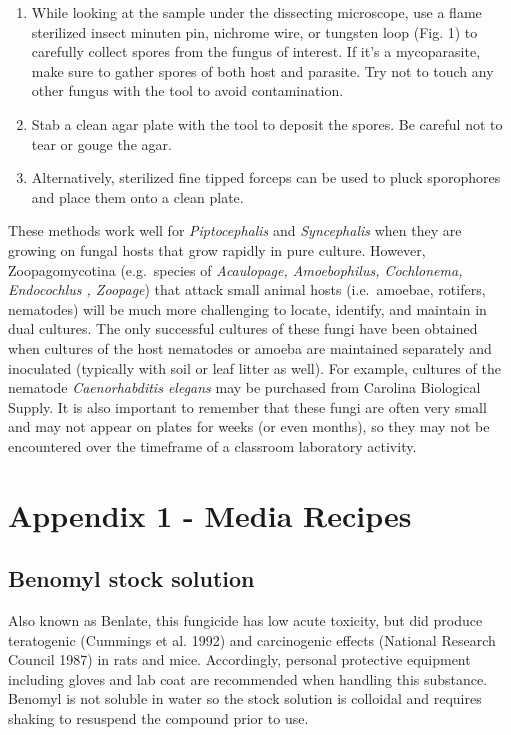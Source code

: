 \documentclass[]{book}
\providecommand{\tightlist}{%
  \setlength{\itemsep}{0pt}\setlength{\parskip}{0pt}}
\begin{document}
\begin{enumerate}
\def\labelenumi{\arabic{enumi}.}
\tightlist
\item
  While looking at the sample under the dissecting microscope, use a
  flame sterilized insect minuten pin, nichrome wire, or tungsten loop
  (Fig. 1) to carefully collect spores from the fungus of interest. If
  it's a mycoparasite, make sure to gather spores of both host and
  parasite. Try not to touch any other fungus with the tool to avoid
  contamination.
\item
  Stab a clean agar plate with the tool to deposit the spores. Be
  careful not to tear or gouge the agar.
\item
  Alternatively, sterilized fine tipped forceps can be used to pluck
  sporophores and place them onto a clean plate.
\end{enumerate}

These methods work well for \emph{Piptocephalis} and \emph{Syncephalis}
when they are growing on fungal hosts that grow rapidly in pure culture.
However, Zoopagomycotina (e.g.~species of \emph{Acaulopage,
Amoebophilus, Cochlonema, Endocochlus , Zoopage}) that attack small
animal hosts (i.e.~amoebae, rotifers, nematodes) will be much more
challenging to locate, identify, and maintain in dual cultures. The only
successful cultures of these fungi have been obtained when cultures of
the host nematodes or amoeba are maintained separately and inoculated
(typically with soil or leaf litter as well). For example, cultures of
the nematode \emph{Caenorhabditis elegans} may be purchased from
Carolina Biological Supply. It is also important to remember that these
fungi are often very small and may not appear on plates for weeks (or
even months), so they may not be encountered over the timeframe of a
classroom laboratory activity.

\section{Appendix 1 - Media Recipes}\label{appendix-1---media-recipes}

\subsection{Benomyl stock solution}\label{benomyl-stock-solution}

Also known as Benlate, this fungicide has low acute toxicity, but did
produce teratogenic (Cummings et al. 1992) and carcinogenic effects
(National Research Council 1987) in rats and mice. Accordingly, personal
protective equipment including gloves and lab coat are recommended when
handling this substance. Benomyl is not soluble in water so the stock
solution is colloidal and requires shaking to resuspend the compound
prior to use.
\end{document}
